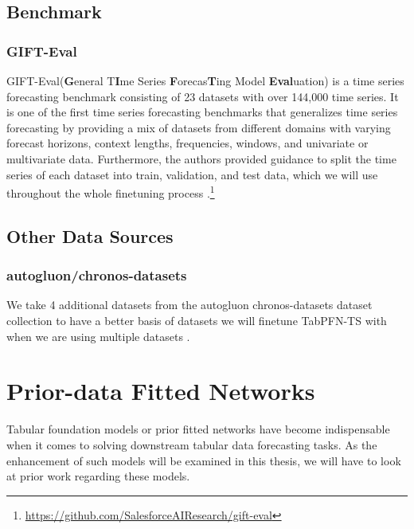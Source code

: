 \subsection{Benchmark}
\subsubsection{GIFT-Eval}
GIFT-Eval(\textbf{G}eneral T\textbf{I}me Series \textbf{F}orecas\textbf{T}ing Model \textbf{Eval}uation) is a time series forecasting benchmark consisting of 23 datasets with over 144,000 time series.
It is one of the first time series forecasting benchmarks that generalizes time series forecasting by providing a mix of datasets from different domains with varying forecast horizons, context lengths, frequencies, windows, and univariate or multivariate data.
Furthermore, the authors provided guidance to split the time series of each dataset into train, validation, and test data, which we will use throughout the whole finetuning process \citep{aksu2024giftevalbenchmarkgeneraltime}.\footnote{\url{https://github.com/SalesforceAIResearch/gift-eval}}
\subsection{Other Data Sources}
\subsubsection{autogluon/chronos-datasets}
We take 4 additional datasets from the autogluon chronos-datasets dataset collection to have a better basis of datasets we will finetune TabPFN-TS with when we are using multiple datasets \citep{ansari2024chronos}.
\section{Prior-data Fitted Networks}
Tabular foundation models or prior fitted networks have become indispensable when it comes to solving downstream tabular data forecasting tasks.
As the enhancement of such models will be examined in this thesis, we will have to look at prior work regarding these models.
